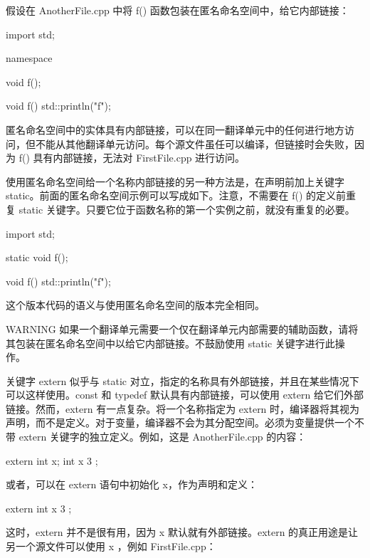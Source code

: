 假设在 AnotherFile.cpp 中将 f() 函数包装在匿名命名空间中，给它内部链接：

\begin{cpp}
import std;

namespace
{
    void f();

    void f()
    {
        std::println("f");
    }
}
\end{cpp}

匿名命名空间中的实体具有内部链接，可以在同一翻译单元中的任何进行地方访问，但不能从其他翻译单元访问。每个源文件虽任可以编译，但链接时会失败，因为 f() 具有内部链接，无法对 FirstFile.cpp 进行访问。

使用匿名命名空间给一个名称内部链接的另一种方法是，在声明前加上关键字 static。前面的匿名命名空间示例可以写成如下。注意，不需要在 f() 的定义前重复 static 关键字。只要它位于函数名称的第一个实例之前，就没有重复的必要。

\begin{cpp}
import std;

static void f();

void f()
{
    std::println("f");
}
\end{cpp}

这个版本代码的语义与使用匿名命名空间的版本完全相同。

\begin{myWarning}{WARNING}
如果一个翻译单元需要一个仅在翻译单元内部需要的辅助函数，请将其包装在匿名命名空间中以给它内部链接。不鼓励使用 static 关键字进行此操作。
\end{myWarning}


关键字 extern 似乎与 static 对立，指定的名称具有外部链接，并且在某些情况下可以这样使用。const 和 typedef 默认具有内部链接，可以使用 extern 给它们外部链接。然而，extern 有一点复杂。将一个名称指定为 extern 时，编译器将其视为声明，而不是定义。对于变量，编译器不会为其分配空间。必须为变量提供一个不带 extern 关键字的独立定义。例如，这是 AnotherFile.cpp 的内容：

\begin{cpp}
extern int x;
int x { 3 };
\end{cpp}

或者，可以在 extern 语句中初始化 x，作为声明和定义：

\begin{cpp}
extern int x { 3 };
\end{cpp}

这时，extern 并不是很有用，因为 x 默认就有外部链接。extern 的真正用途是让另一个源文件可以使用 x ，例如 FirstFile.cpp：

